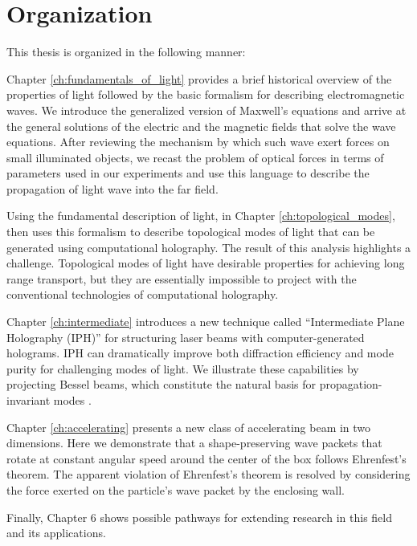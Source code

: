 \section{Organization}

This thesis is organized in the following manner:

Chapter \ref{ch:fundamentals_of_light} provides a brief historical overview of the properties of light followed by the basic formalism for describing electromagnetic waves. We introduce the generalized version of Maxwell's equations and arrive at the general solutions of the electric and the magnetic fields that solve the wave equations. After reviewing the mechanism by which such wave exert forces on small illuminated objects, we recast the problem of optical forces in terms of parameters used in our experiments and use this language to describe the propagation of light wave into the far field. 

Using the fundamental description of light, in Chapter \ref{ch:topological_modes}, then uses this formalism to  describe topological modes of light that can be generated using computational holography. The result of this analysis highlights a challenge. Topological modes of light have desirable properties for achieving long range transport, but they are essentially impossible to project with the conventional technologies of computational holography.

Chapter \ref{ch:intermediate} introduces a new technique called ``Intermediate Plane Holography (IPH)''  for structuring laser beams with computer-generated holograms. IPH can dramatically improve both diffraction efficiency and mode purity for challenging modes of light. We illustrate these capabilities by projecting Bessel beams, which constitute the natural basis for propagation-invariant modes \cite{durnin87,durnin87a}.

Chapter \ref{ch:accelerating} presents a new class of accelerating beam in two dimensions. Here we demonstrate that a shape-preserving wave packets that rotate at constant angular speed around the center of the box follows Ehrenfest's theorem. The apparent violation of Ehrenfest’s theorem is resolved by considering the force exerted on the particle’s wave packet by the enclosing wall.

Finally, Chapter 6 shows possible pathways for extending research in this field and its applications. 